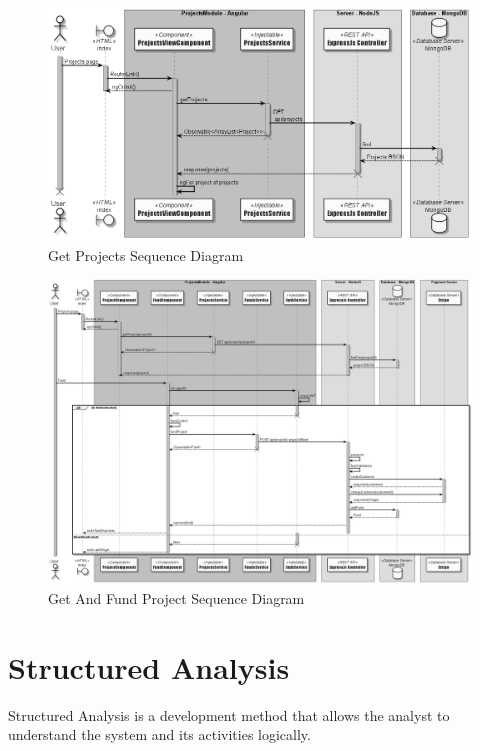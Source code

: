 \begin{figure}[!ht]
      \center
      \includegraphics[scale=0.40]{assets/projects.png}
      \caption{Get Projects Sequence Diagram}
      \label{fig:projects seq}

\end{figure}

\begin{figure}[!ht]
      \center
      \includegraphics[scale=0.37,angle=90]{assets/project.png}
      \caption{Get And Fund Project Sequence Diagram}
      \label{fig:project seq}

\end{figure}
\clearpage
\section{Structured Analysis}
Structured Analysis is a development method that allows the analyst to understand the system and its activities logically.

